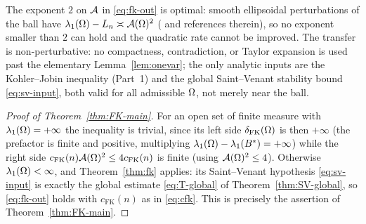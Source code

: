 \begin{remark}\label{rem:sharp}
The exponent $2$ on $\mathcal A$ in \eqref{eq:fk-out} is optimal: smooth
ellipsoidal perturbations of the ball have
$\lambda_1(\Omega)-L_n\asymp\mathcal A(\Omega)^2$
(\cite{BraDeP2017,Brasco2014} and references therein), so no exponent
smaller than $2$ can hold and the quadratic rate cannot be improved. The
transfer is non-perturbative: no compactness, contradiction, or Taylor
expansion is used past the elementary Lemma~\ref{lem:onevar}; the only
analytic inputs are the Kohler--Jobin inequality (Part~1) and the global
Saint--Venant stability bound \eqref{eq:sv-input}, both valid for all
admissible $\Omega$, not merely near the ball.
\end{remark}

\begin{proof}[Proof of Theorem~\ref{thm:FK-main}]
For an open set of finite measure with $\lambda_1(\Omega)=+\infty$ the
inequality is trivial, since its left side $\delta_{\mathrm{FK}}(\Omega)$ is
then $+\infty$ (the prefactor is finite and positive, multiplying
$\lambda_1(\Omega)-\lambda_1(B^*)=+\infty$) while the right side
$c_{\mathrm{FK}}(n)\mathcal A(\Omega)^2\le 4c_{\mathrm{FK}}(n)$ is finite (using
$\mathcal A(\Omega)^2\le4$). Otherwise $\lambda_1(\Omega)<\infty$, and
Theorem~\ref{thm:fk} applies: its Saint--Venant hypothesis
\eqref{eq:sv-input} is exactly the global estimate \eqref{eq:T-global} of
Theorem~\ref{thm:SV-global}, so \eqref{eq:fk-out} holds with
$c_{\mathrm{FK}}(n)$ as in \eqref{eq:cfk}. This is precisely the assertion of
Theorem~\ref{thm:FK-main}.
\end{proof}

